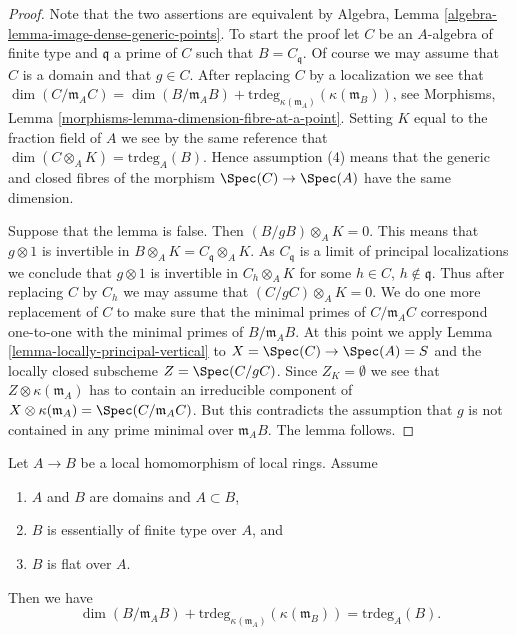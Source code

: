 \begin{proof}
Note that the two assertions are equivalent by
Algebra, Lemma \ref{algebra-lemma-image-dense-generic-points}.
To start the proof let $C$ be an $A$-algebra of finite type
and $\mathfrak q$ a prime of $C$ such that $B = C_{\mathfrak q}$.
Of course we may assume that $C$ is a domain and that $g \in C$.
After replacing $C$ by a localization we see that
$\dim(C/\mathfrak m_AC) = \dim(B/\mathfrak m_AB) +
\text{trdeg}_{\kappa(\mathfrak m_A)}(\kappa(\mathfrak m_B))$, see
Morphisms, Lemma \ref{morphisms-lemma-dimension-fibre-at-a-point}.
Setting $K$ equal to the fraction field of $A$
we see by the same reference that
$\dim(C \otimes_A K) = \text{trdeg}_A(B)$. Hence assumption
(4) means that the generic and closed fibres of the morphism
$\Spec(C) \to \Spec(A)$ have the same dimension.

\medskip\noindent
Suppose that the lemma is false. Then $(B/gB) \otimes_A K = 0$.
This means that $g \otimes 1$ is invertible in $B \otimes_A K
= C_{\mathfrak q} \otimes_A K$. As $C_{\mathfrak q}$ is a limit
of principal localizations we conclude that $g \otimes 1$
is invertible in $C_h \otimes_A K$ for some
$h \in C$, $h \not \in \mathfrak q$. Thus after replacing $C$
by $C_h$ we may assume that $(C/gC) \otimes_A K = 0$.
We do one more replacement of $C$ to make sure that the minimal
primes of $C/\mathfrak m_AC$ correspond one-to-one with the minimal
primes of $B/\mathfrak m_AB$. At this point we apply
Lemma \ref{lemma-locally-principal-vertical}
to $X = \Spec(C) \to \Spec(A) = S$ and the locally closed
subscheme $Z = \Spec(C/gC)$. Since $Z_K = \emptyset$ we see that
$Z \otimes \kappa(\mathfrak m_A)$ has to contain an irreducible
component of
$X \otimes \kappa(\mathfrak m_A) = \Spec(C/\mathfrak m_AC)$.
But this contradicts the assumption that $g$ is not contained
in any prime minimal over $\mathfrak m_AB$. The lemma follows.
\end{proof}

\begin{lemma}
\label{lemma-equality-dimensions}
Let $A \to B$ be a local homomorphism of local rings. Assume
\begin{enumerate}
\item $A$ and $B$ are domains and $A \subset B$,
\item $B$ is essentially of finite type over $A$, and
\item $B$ is flat over $A$.
\end{enumerate}
Then we have
$$
\dim(B/\mathfrak m_AB) +
\text{trdeg}_{\kappa(\mathfrak m_A)}(\kappa(\mathfrak m_B)) =
\text{trdeg}_A(B).
$$
\end{lemma}

